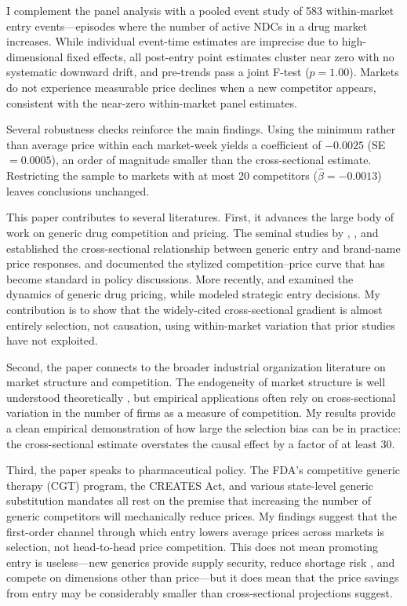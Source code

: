 \documentclass[12pt]{article}
\begin{document}
I complement the panel analysis with a pooled event study of 583 within-market entry events---episodes where the number of active NDCs in a drug market increases. While individual event-time estimates are imprecise due to high-dimensional fixed effects, all post-entry point estimates cluster near zero with no systematic downward drift, and pre-trends pass a joint F-test ($p = 1.00$). Markets do not experience measurable price declines when a new competitor appears, consistent with the near-zero within-market panel estimates.

Several robustness checks reinforce the main findings. Using the minimum rather than average price within each market-week yields a coefficient of $-0.0025$ (SE $= 0.0005$), an order of magnitude smaller than the cross-sectional estimate. Restricting the sample to markets with at most 20 competitors ($\hat{\beta} = -0.0013$) leaves conclusions unchanged.

This paper contributes to several literatures. First, it advances the large body of work on generic drug competition and pricing. The seminal studies by \citet{Caves1991}, \citet{Frank1997}, and \citet{Reiffen2002} established the cross-sectional relationship between generic entry and brand-name price responses. \citet{Grabowski2007} and \citet{Berndt2007} documented the stylized competition--price curve that has become standard in policy discussions. More recently, \citet{Gupta2018} and \citet{Dave2017} examined the dynamics of generic drug pricing, while \citet{Reiffen2004} modeled strategic entry decisions. My contribution is to show that the widely-cited cross-sectional gradient is almost entirely selection, not causation, using within-market variation that prior studies have not exploited.

Second, the paper connects to the broader industrial organization literature on market structure and competition. The endogeneity of market structure is well understood theoretically \citep{Bresnahan1991, Berry1992, Sutton1991}, but empirical applications often rely on cross-sectional variation in the number of firms as a measure of competition. My results provide a clean empirical demonstration of how large the selection bias can be in practice: the cross-sectional estimate overstates the causal effect by a factor of at least 30.

Third, the paper speaks to pharmaceutical policy. The FDA's competitive generic therapy (CGT) program, the CREATES Act, and various state-level generic substitution mandates all rest on the premise that increasing the number of generic competitors will mechanically reduce prices. My findings suggest that the first-order channel through which entry lowers average prices across markets is selection, not head-to-head price competition. This does not mean promoting entry is useless---new generics provide supply security, reduce shortage risk \citep{Yurukoglu2017}, and compete on dimensions other than price---but it does mean that the price savings from entry may be considerably smaller than cross-sectional projections suggest.
\end{document}
